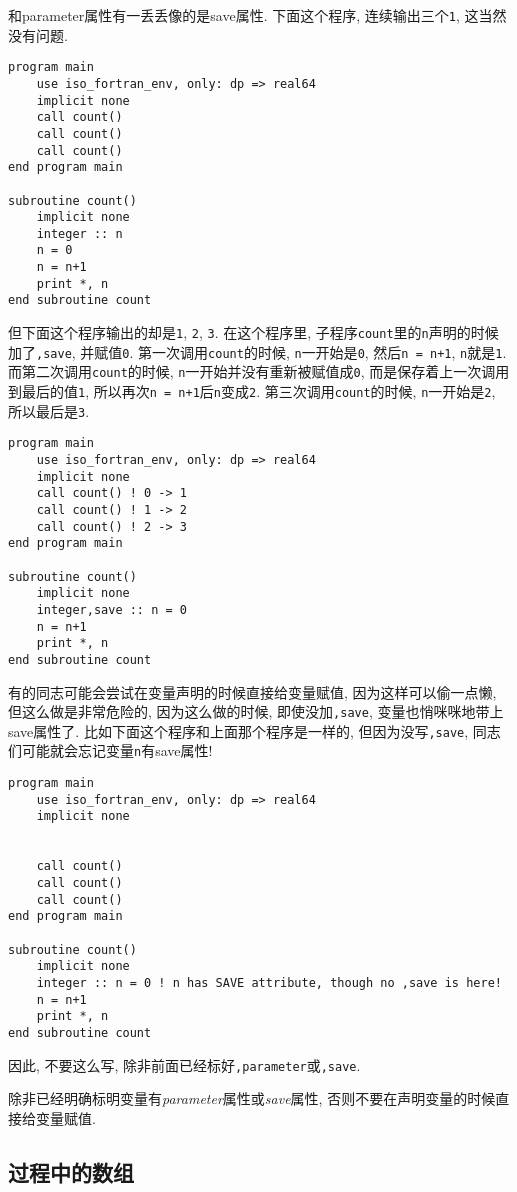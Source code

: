 和parameter属性有一丢丢像的是save属性. 下面这个程序, 连续输出三个\verb|1|, 这当然没有问题.
\begin{verbatim}
program main
    use iso_fortran_env, only: dp => real64
    implicit none
    call count()
    call count()
    call count()
end program main

subroutine count()
    implicit none
    integer :: n
    n = 0
    n = n+1
    print *, n
end subroutine count
\end{verbatim}
但下面这个程序输出的却是\verb|1|, \verb|2|, \verb|3|. 在这个程序里, 子程序\verb|count|里的\verb|n|声明的时候加了\verb|,save|, 并赋值\verb|0|. 第一次调用\verb|count|的时候, \verb|n|一开始是\verb|0|, 然后\verb|n = n+1|, \verb|n|就是\verb|1|. 而第二次调用\verb|count|的时候, \verb|n|一开始并没有重新被赋值成\verb|0|, 而是保存着上一次调用到最后的值\verb|1|, 所以再次\verb|n = n+1|后\verb|n|变成\verb|2|. 第三次调用\verb|count|的时候, \verb|n|一开始是\verb|2|, 所以最后是\verb|3|.
\begin{verbatim}
program main
    use iso_fortran_env, only: dp => real64
    implicit none
    call count() ! 0 -> 1
    call count() ! 1 -> 2
    call count() ! 2 -> 3
end program main

subroutine count()
    implicit none
    integer,save :: n = 0
    n = n+1
    print *, n
end subroutine count
\end{verbatim}
有的同志可能会尝试在变量声明的时候直接给变量赋值, 因为这样可以偷一点懒, 但这么做是非常危险的, 因为这么做的时候, 即使没加\verb|,save|, 变量也悄咪咪地带上save属性了. 比如下面这个程序和上面那个程序是一样的, 但因为没写\verb|,save|, 同志们可能就会忘记变量\verb|n|有save属性!
\begin{verbatim}
program main
    use iso_fortran_env, only: dp => real64
    implicit none


    call count()
    call count()
    call count()
end program main

subroutine count()
    implicit none
    integer :: n = 0 ! n has SAVE attribute, though no ,save is here!
    n = n+1
    print *, n
end subroutine count
\end{verbatim}
因此, 不要这么写, 除非前面已经标好\verb|,parameter|或\verb|,save|.

\begin{convention}
    除非已经明确标明变量有\emph{parameter}属性或\emph{save}属性, 否则不要在声明变量的时候直接给变量赋值.
\end{convention}

\subsection{过程中的数组}

